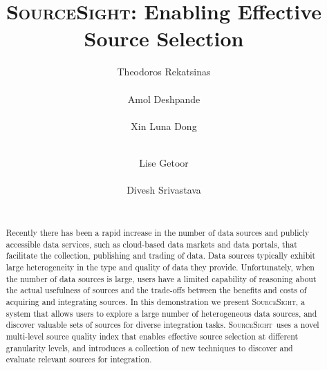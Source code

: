 \documentclass{vldb}
\newcommand\system{\textsc{SourceSight}}
\begin{document}

\title{{\LARGE \system}: Enabling Effective Source Selection}


\author{
\alignauthor
Theodoros Rekatsinas\\
       \\
\alignauthor
Amol Deshpande\\
       \\
\alignauthor 
Xin Luna Dong\\
       \\
\and  %
\alignauthor 
Lise Getoor\\
       \\
\alignauthor Divesh Srivastava\\
       \\
}

\maketitle

\begin{abstract}
Recently there has been a rapid increase in the number of data sources and publicly accessible data services, such as cloud-based data markets and data portals, that facilitate the collection, publishing and trading of data. Data sources typically exhibit large heterogeneity in the type and quality of data they provide. Unfortunately, when the number of data sources is large, users have a limited capability of reasoning about the actual usefulness of sources and the trade-offs between the benefits and costs of acquiring and integrating sources. In this demonstration we present \system, a system that allows users to explore a large number of heterogeneous data sources, and discover valuable sets of sources for diverse integration tasks. \system~uses a novel multi-level source quality index that enables effective source selection at different granularity levels, and introduces a collection of new techniques to discover and evaluate relevant sources for integration.
\end{abstract}
\end{document}
